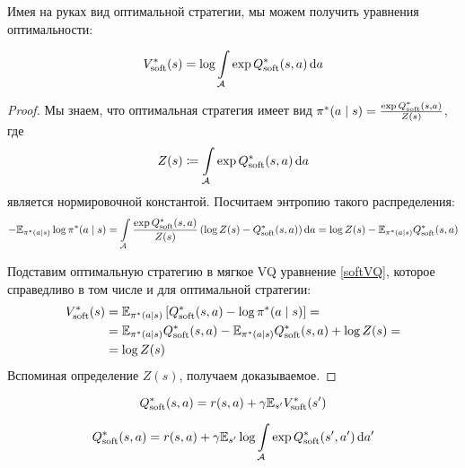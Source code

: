 
Имея на руках вид оптимальной стратегии, мы можем получить уравнения оптимальности:

\begin{theorem}
\begin{equation}\label{softV*Q*}
V^*_{\mathrm{soft}}(s) = \log \int\limits_{\mathcal{A}} \exp Q^*_{\mathrm{soft}}(s, a) \mathop{}\!\mathrm{d} a
\end{equation}
\begin{proof}
Мы знаем, что оптимальная стратегия имеет вид $\pi^*(a \mid s) \HM= \frac{\exp{Q^*_{\soft}(s, a)}}{Z(s)}$, где
$$Z(s) \coloneqq \int\limits_{\mathcal{A}} \exp Q^*_{\mathrm{soft}}(s, a) \mathop{}\!\mathrm{d} a$$
является нормировочной константой. Посчитаем энтропию такого распределения:
$$-\mathbb{E}_{\pi^*(a \mid s)} \log \pi^*(a \mid s) = \int\limits_{\mathcal{A}} \frac{\exp{Q^*_{\mathrm{soft}}(s, a)}}{Z(s)} \left(\log Z(s) - Q^*_{\mathrm{soft}}(s, a) \right) \mathop{}\!\mathrm{d} a = \log Z(s) - \mathbb{E}_{\pi^*(a \mid s)} Q^*_{\mathrm{soft}}(s, a)$$

Подставим оптимальную стратегию в мягкое VQ уравнение \eqref{softVQ}, которое справедливо в том числе и для оптимальной стратегии:
\begin{align*}
V^*_{\mathrm{soft}}(s) &= \mathbb{E}_{\pi^*(a \mid s)} \left[ Q^*_{\mathrm{soft}}(s, a) - \log \pi^*(a \mid s) \right] = \\ &= \mathbb{E}_{\pi^*(a \mid s)} Q^*_{\mathrm{soft}}(s, a) - \mathbb{E}_{\pi^*(a \mid s)} Q^*_{\mathrm{soft}}(s, a) + \log Z(s) = \\ &= \log Z(s)
\end{align*}
Вспоминая определение $Z(s)$, получаем доказываемое.
\end{proof}
\end{theorem}

\begin{proposition}
$$Q^*_{\mathrm{soft}}(s, a) = r(s, a) + \gamma \mathbb{E}_{s'} V^*_{\mathrm{soft}}(s')$$
\end{proposition}

\begin{proposition}
\begin{equation}\label{softQ*Q*}
Q^*_{\mathrm{soft}}(s, a) = r(s, a) + \gamma \mathbb{E}_{s'} \log \int\limits_{\mathcal{A}} \exp Q^*_{\mathrm{soft}}(s', a') \mathop{}\!\mathrm{d} a'
\end{equation}
\end{proposition}

